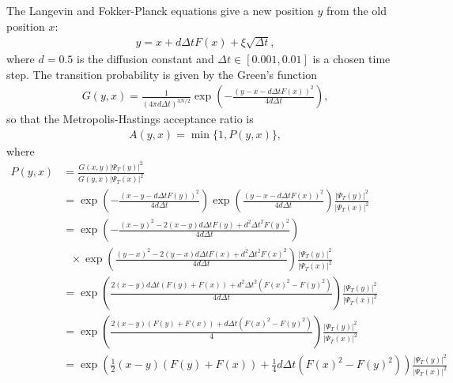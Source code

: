 \documentclass[12pt]{article}
\begin{document}
\noindent The Langevin and Fokker-Planck equations give a new position $y$ from the old position $x$:
\begin{align}
y = x + d\Delta tF(x) + \xi \sqrt{\Delta t},
\end{align}
where $d=0.5$ is the diffusion constant and $\Delta t \in [0.001,0.01]$ is a chosen time step. The transition probability is given by the Green's function
\begin{align}
G(y,x)=\frac{1}{(4\pi d \Delta t)^{3N/2}} \exp \left( -\frac{(y-x-d\Delta t F(x))^2}{4 d \Delta t} \right),
\end{align}
so that the Metropolis-Hastings acceptance ratio is
\begin{align}
A(y,x) = \min \{ 1, P(y,x) \},
\end{align}
where 
\begin{align*}
P(y,x) &= \frac{G(x,y) | \Psi_T(y) | ^2}{G(y,x) | \Psi_T(x) | ^2}\\
&= \exp \left( -\frac{(x-y-d\Delta t F(y))^2}{4 d \Delta t} \right) \exp \left( \frac{(y-x-d\Delta t F(x))^2}{4 d \Delta t} \right) \frac{| \Psi_T(y) | ^2}{ | \Psi_T(x) | ^2}\\
&= \exp \left( -\frac{(x-y)^2-2(x-y)d\Delta t F(y) + d^2 \Delta t^2 F(y)^2}{4d\Delta t} \right)\\
& \ \ \  \times \exp \left( \frac{(y-x)^2-2(y-x)d\Delta t F(x) + d^2 \Delta t^2 F(x)^2}{4d\Delta t} \right) \frac{| \Psi_T(y) | ^2}{ | \Psi_T(x) | ^2}\\
&= \exp \left( \frac{2(x-y)d\Delta t (F(y)+F(x)) + d^2 \Delta t^2 (F(x)^2-F(y)^2)}{4d\Delta t} \right) \frac{| \Psi_T(y) | ^2}{ | \Psi_T(x) | ^2}\\
&= \exp \left( \frac{2(x-y) (F(y)+F(x)) + d \Delta t (F(x)^2-F(y)^2)}{4} \right) \frac{| \Psi_T(y) | ^2}{ | \Psi_T(x) | ^2}\\
&= \exp \left( \frac{1}{2}(x-y) (F(y)+F(x)) + \frac{1}{4} d \Delta t (F(x)^2-F(y)^2) \right) \frac{| \Psi_T(y) | ^2}{ | \Psi_T(x) | ^2}\\
\end{align*}
\end{document}
